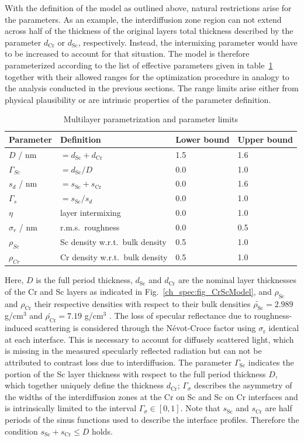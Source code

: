 With the definition of the model as outlined above, natural restrictions arise for the parameters. As an example, the interdiffusion zone region can not extend across half of the thickness of the original layers total thickness described by the parameter $d_\text{Cr}$ or $d_\text{Sc}$, respectively. Instead, the intermixing parameter would have to be increased to account for that situation. The model is therefore parameterized according to the list of effective parameters given in table~\ref{ch_spec:tbl_CrSc_gradual_parametrization} together with their allowed ranges for the optimization procedure in analogy to the analysis conducted in the previous sections. The range limits arise either from physical plausibility or are intrinsic properties of the parameter definition.
\begin{table}[htbp]
\centering
\caption{Multilayer parametrization and parameter limits}
\label{ch_spec:tbl_CrSc_gradual_parametrization}
\begin{tabular}{@{}llll@{}}
\toprule
Parameter & Definition & Lower bound & Upper bound\\ \midrule
$D$ / nm & $= d_\text{Sc} + d_\text{Cr}$ & 1.5&1.6 \\ 
$\Gamma_{Sc}$ & $= d_\text{Sc} / D$&0.0 &1.0 \\ 
$s_d$ / nm&$=s_\text{Sc} + s_\text{Cr}$&0.0 & 1.6\\ 
$\Gamma_s$ &$= s_\text{Sc} / s_d$& 0.0& 1.0\\ 
$\eta$ &layer intermixing& 0.0& 1.0\\ 
$\sigma_r$ / nm & r.m.s.~roughness& 0.0& 0.5\\ 
$\rho_{Sc}$ &Sc density w.r.t.~bulk density & 0.5& 1.0\\ 
$\rho_{Cr}$ &Cr density w.r.t.~bulk density& 0.5& 1.0\\ 
 \bottomrule
\end{tabular}
\end{table}
Here, $D$ is the full period thickness, $d_\text{Sc}$ and $d_\text{Cr}$ are the 
nominal layer thicknesses of the Cr and Sc layers as indicated in 
Fig.~\ref{ch_spec:fig_CrScModel}, and $\rho_\text{Sc}$ and $\rho_\text{Cr}$ their 
respective densities with respect to their bulk densities 
$\tilde{\rho_\text{Sc}} = 2.989$ g/cm$^3$ and $\tilde{\rho_\text{Cr}} = 7.19$ 
g/cm$^3$ \cite{henke_x-ray_1993}. The loss of specular 
reflectance due to roughness-induced scattering is considered through the 
N\'{e}vot-Croce factor using $\sigma_\text{r}$ identical at each interface. This is necessary to account for diffusely scattered light, which is missing in the measured specularly reflected radiation but can not be attributed to contrast loss due to interdiffusion. The parameter $\Gamma_\text{Sc}$ indicates the portion of the Sc layer thickness 
with respect to the full period thickness $D$, which together uniquely define the thickness $d_\text{Cr}$; $\Gamma_\sigma$ describes the 
asymmetry of the widths of the interdiffusion zones at the Cr on Sc and Sc on Cr 
interfaces and is intrinsically limited to the interval $\Gamma_\sigma \in [0,1]$. Note that 
$s_\text{Sc}$ and $s_\text{Cr}$ are half periods of the sinus functions used to 
describe the interface profiles. Therefore the condition $s_\text{Sc} + 
s_\text{Cr} \leq D$ holds.


